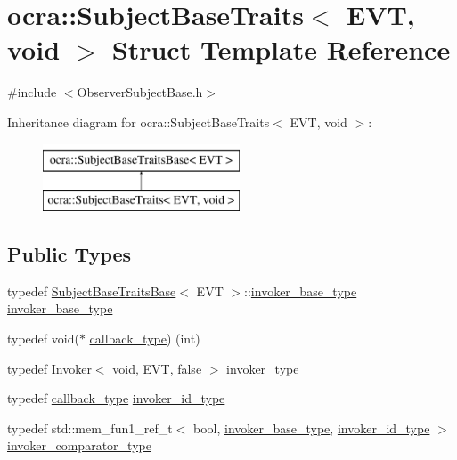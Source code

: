 \hypertarget{structocra_1_1SubjectBaseTraits_3_01EVT_00_01void_01_4}{}\section{ocra\+:\+:Subject\+Base\+Traits$<$ E\+VT, void $>$ Struct Template Reference}
\label{structocra_1_1SubjectBaseTraits_3_01EVT_00_01void_01_4}


{\ttfamily \#include $<$Observer\+Subject\+Base.\+h$>$}

Inheritance diagram for ocra\+:\+:Subject\+Base\+Traits$<$ E\+VT, void $>$\+:\begin{figure}[H]
\begin{center}
\leavevmode
\includegraphics[height=2.000000cm]{d9/d47/structocra_1_1SubjectBaseTraits_3_01EVT_00_01void_01_4}
\end{center}
\end{figure}
\subsection*{Public Types}
\begin{DoxyCompactItemize}
\item 
typedef \hyperlink{structocra_1_1SubjectBaseTraitsBase}{Subject\+Base\+Traits\+Base}$<$ E\+VT $>$\+::\hyperlink{structocra_1_1SubjectBaseTraitsBase_a439671662c8f8f3e80e6675f008dec3f}{invoker\+\_\+base\+\_\+type} \hyperlink{structocra_1_1SubjectBaseTraits_3_01EVT_00_01void_01_4_a28d0e1b20cde0e239218e2ef724502b1}{invoker\+\_\+base\+\_\+type}
\item 
typedef void($\ast$ \hyperlink{structocra_1_1SubjectBaseTraits_3_01EVT_00_01void_01_4_a805e01034816edb44ee4269aba6c5beb}{callback\+\_\+type}) (int)
\item 
typedef \hyperlink{classocra_1_1Invoker}{Invoker}$<$ void, E\+VT, false $>$ \hyperlink{structocra_1_1SubjectBaseTraits_3_01EVT_00_01void_01_4_af6c08a6cdc4753f4246a8eebaf73152c}{invoker\+\_\+type}
\item 
typedef \hyperlink{structocra_1_1SubjectBaseTraits_3_01EVT_00_01void_01_4_a805e01034816edb44ee4269aba6c5beb}{callback\+\_\+type} \hyperlink{structocra_1_1SubjectBaseTraits_3_01EVT_00_01void_01_4_a35ce9f06a9f2a9e766ad2fb892283d08}{invoker\+\_\+id\+\_\+type}
\item 
typedef std\+::mem\+\_\+fun1\+\_\+ref\+\_\+t$<$ bool, \hyperlink{structocra_1_1SubjectBaseTraitsBase_a439671662c8f8f3e80e6675f008dec3f}{invoker\+\_\+base\+\_\+type}, \hyperlink{structocra_1_1SubjectBaseTraits_3_01EVT_00_01void_01_4_a35ce9f06a9f2a9e766ad2fb892283d08}{invoker\+\_\+id\+\_\+type} $>$ \hyperlink{structocra_1_1SubjectBaseTraits_3_01EVT_00_01void_01_4_a1103b087174cb0f6e007f554c214c4d4}{invoker\+\_\+comparator\+\_\+type}
\end{DoxyCompactItemize}


